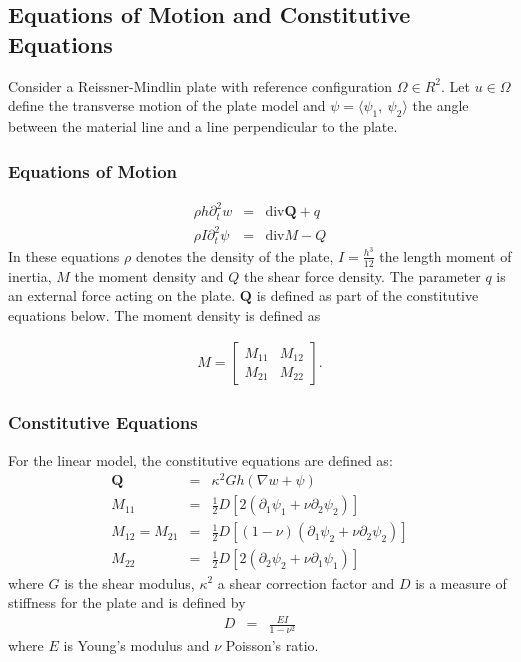 \documentclass[../../main.tex]{subfiles}
\begin{document}
	\subsection{Equations of Motion and Constitutive Equations}\label{ssec:P_Model:EquationsOfMotion+ConstitutiveEquation}
	Consider a Reissner-Mindlin plate with reference configuration $\Omega \in R^2$. Let $u \in \Omega$ define the transverse motion of the plate model and $\psi = \langle \psi_1, \ \psi_2 \rangle$ the angle between the material line and a line perpendicular to the plate.
	
	\subsubsection*{Equations of Motion}\label{sssec:P_Model:EquationsOfMotion}
	\begin{eqnarray}
		\rho h \partial_t^2 w & = & \textrm{div} \mathbf{Q} + q \label{eq:P_Model:EM1}\\
		\rho I \partial_t^2 {\psi} & = & \textrm{div} M - Q \label{P2}\label{eq:P_Model:EM1}
	\end{eqnarray} \label{sym:bfQ}
	In these equations $\rho$ denotes the density of the plate, $\displaystyle I = \frac{h^3}{12}$ the length moment of inertia, $M$ the moment density and $Q$ the shear force density. The parameter $q$ is an external force acting on the plate. $\mathbf{Q}$ is defined as part of the constitutive equations below. The moment density is defined as
	
	\begin{eqnarray*}
		M = 
		\begin{bmatrix}
			M_{11} & M_{12}\\
			M_{21} & M_{22}
		\end{bmatrix}.
	\end{eqnarray*}
	
	\subsubsection*{Constitutive Equations}\label{sssec:P_Model:ConstitutiveEquation}
	For the linear model, the constitutive equations are defined as:
	\begin{eqnarray}
		\mathbf{Q} & = & \kappa^2 G h(\nabla w + \psi) \label{eq:P_Model:CE1} \\
		M_{11} & = & \frac{1}{2} D \left[2(\partial_1 \psi_1 + \nu \partial_2 \psi_2)\right]  \label{eq:P_Model:CE2}\\
		M_{12} =  M_{21} & = & \frac{1}{2} D \left[(1-\nu)(\partial_1 \psi_2 + \nu \partial_2 \psi_2)\right] \label{eq:P_Model:CE3} \\
		M_{22} & = & \frac{1}{2} D \left[2(\partial_2 \psi_2 + \nu \partial_1 \psi_1)\right] \label{eq:P_Model:CE4}
	\end{eqnarray}
	where $G$ is the shear modulus, $\kappa^2$ a shear correction factor and $D$ is a measure of stiffness for the plate and is defined by
	\begin{eqnarray*}
		D & = & \frac{EI}{1-\nu^2}
	\end{eqnarray*}
	where $E$ is Young's modulus and $\nu$ Poisson's ratio.\\
	
\end{document}
